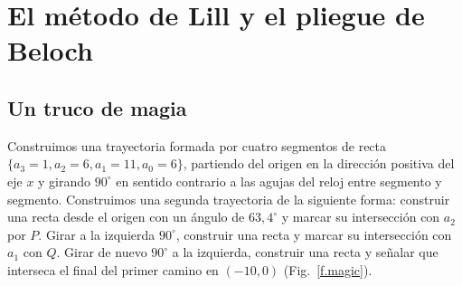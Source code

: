 
\chapter{El método de Lill y el pliegue de Beloch}\label{c.origami-cube}


\section{Un truco de magia}\label{s.magic}

Construimos una trayectoria formada por cuatro segmentos de recta $\{a_3=1,a_2=6,a_1=11,a_0=6\}$, partiendo del origen en la dirección positiva del eje $x$ y girando $90^\circ$ en sentido contrario a las agujas del reloj entre segmento y segmento. Construimos una segunda trayectoria de la siguiente forma: construir una recta desde el origen con un ángulo de $63,4^\circ$ y marcar su intersección con $a_2$ por $P$. Girar a la izquierda $90^\circ$, construir una recta y marcar su intersección con $a_1$ con $Q$. Girar de nuevo $90^\circ$ a la izquierda, construir una recta y señalar que interseca el final del primer camino en $(-10,0)$ (Fig.~\ref{f.magic}).

